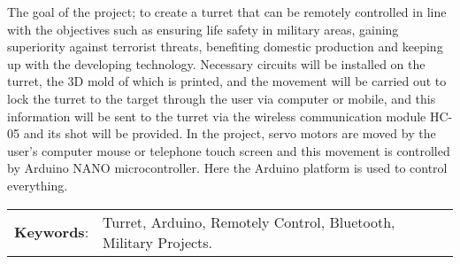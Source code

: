 The goal of the project; to create a turret that can be remotely controlled in line with the objectives such as ensuring life safety in military areas, gaining superiority against terrorist threats, benefiting domestic production and keeping up with the developing technology. Necessary circuits will be installed on the turret, the 3D mold of which is printed, and the movement will be carried out to lock the turret to the target through the user via computer or mobile, and this information will be sent to the turret via the wireless communication module HC-05 and its shot will be provided. In the project, servo motors are moved by the user's computer mouse or telephone touch screen and this movement is controlled by Arduino NANO microcontroller. Here the Arduino platform is used to control everything.
\vspace{3mm}

 \begin{tabular}{ll}
 	{\textbf{Keywords}:} & {Turret, Arduino, Remotely Control, Bluetooth, Military Projects.}  \\   	
 \end{tabular} 
 




